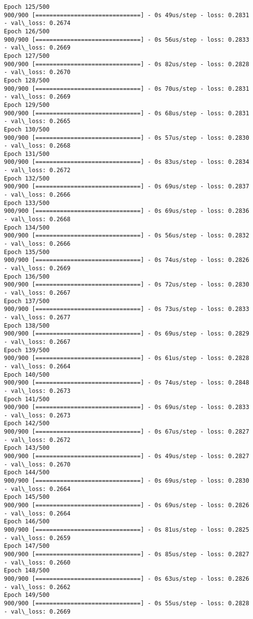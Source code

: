 \documentclass[11pt]{article}
\begin{document}
\begin{Verbatim}[commandchars=\\\{\}]
Epoch 125/500
900/900 [==============================] - 0s 49us/step - loss: 0.2831 - val\_loss: 0.2674
Epoch 126/500
900/900 [==============================] - 0s 56us/step - loss: 0.2833 - val\_loss: 0.2669
Epoch 127/500
900/900 [==============================] - 0s 82us/step - loss: 0.2828 - val\_loss: 0.2670
Epoch 128/500
900/900 [==============================] - 0s 70us/step - loss: 0.2831 - val\_loss: 0.2669
Epoch 129/500
900/900 [==============================] - 0s 68us/step - loss: 0.2831 - val\_loss: 0.2665
Epoch 130/500
900/900 [==============================] - 0s 57us/step - loss: 0.2830 - val\_loss: 0.2668
Epoch 131/500
900/900 [==============================] - 0s 83us/step - loss: 0.2834 - val\_loss: 0.2672
Epoch 132/500
900/900 [==============================] - 0s 69us/step - loss: 0.2837 - val\_loss: 0.2666
Epoch 133/500
900/900 [==============================] - 0s 69us/step - loss: 0.2836 - val\_loss: 0.2668
Epoch 134/500
900/900 [==============================] - 0s 56us/step - loss: 0.2832 - val\_loss: 0.2666
Epoch 135/500
900/900 [==============================] - 0s 74us/step - loss: 0.2826 - val\_loss: 0.2669
Epoch 136/500
900/900 [==============================] - 0s 72us/step - loss: 0.2830 - val\_loss: 0.2667
Epoch 137/500
900/900 [==============================] - 0s 73us/step - loss: 0.2833 - val\_loss: 0.2677
Epoch 138/500
900/900 [==============================] - 0s 69us/step - loss: 0.2829 - val\_loss: 0.2667
Epoch 139/500
900/900 [==============================] - 0s 61us/step - loss: 0.2828 - val\_loss: 0.2664
Epoch 140/500
900/900 [==============================] - 0s 74us/step - loss: 0.2848 - val\_loss: 0.2673
Epoch 141/500
900/900 [==============================] - 0s 69us/step - loss: 0.2833 - val\_loss: 0.2673
Epoch 142/500
900/900 [==============================] - 0s 67us/step - loss: 0.2827 - val\_loss: 0.2672
Epoch 143/500
900/900 [==============================] - 0s 49us/step - loss: 0.2827 - val\_loss: 0.2670
Epoch 144/500
900/900 [==============================] - 0s 69us/step - loss: 0.2830 - val\_loss: 0.2664
Epoch 145/500
900/900 [==============================] - 0s 69us/step - loss: 0.2826 - val\_loss: 0.2664
Epoch 146/500
900/900 [==============================] - 0s 81us/step - loss: 0.2825 - val\_loss: 0.2659
Epoch 147/500
900/900 [==============================] - 0s 85us/step - loss: 0.2827 - val\_loss: 0.2660
Epoch 148/500
900/900 [==============================] - 0s 63us/step - loss: 0.2826 - val\_loss: 0.2662
Epoch 149/500
900/900 [==============================] - 0s 55us/step - loss: 0.2828 - val\_loss: 0.2669

\end{Verbatim}
\end{document}
